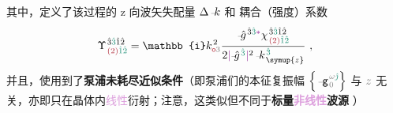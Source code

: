 其中，定义了该过程的 z 向\textcolor{PineGreen}{波矢失配量} $\Delta \xint{\begin{smallmatrix} ~ \\ {}^{}_{\mathcolor{gray}{-}} \\ ~ \end{smallmatrix}}{15}{k}$   和 \textcolor{NavyBlue}{耦合（强度）系数}
\begin{align} \label{eq:coupling-coeff}
	\Upsilon^{\;\! \hat{3} \textcolor{PineGreen}{\hat{3}} \hat{1} \hat{2} }_{\;\! \textcolor{Maroon}{(2)} \textcolor{PineGreen}{\hat{1} \hat{2}}} = \mathbb{i} k_{\textcolor{Maroon}{\mathsf{o}} \mathcolor{gray}{3}}^{\;\! 2} \frac{\xint{{}^{}_{\mathcolor{gray}{-}}}{10}{\hat{g}}^{\;\! \hat{3} \textcolor{PineGreen}{\hat{3}} \textcolor{Plum}{*}}_{\;\! } {\chi}^{\;\! \hat{3} \textcolor{PineGreen}{\hat{3}} \hat{1} \hat{2} }_{\;\! \textcolor{Maroon}{(2)} \textcolor{PineGreen}{\hat{1} \hat{2}}} }{ 2 \textcolor{Plum}{\lvert} \xint{{}^{}_{\mathcolor{gray}{-}}}{10}{\hat{g}}^{\;\! \textcolor{PineGreen}{\hat{3}}} \textcolor{Plum}{\rvert}^2 \xint{\begin{smallmatrix} ~ \\ {}^{}_{\mathcolor{gray}{-}} \\ ~ \end{smallmatrix}}{15}{k}_{\;\! \symup{z}}^{\;\!  \textcolor{PineGreen}{\hat{3}}} } ~,
\end{align}
并且，使用到了\textbf{\textcolor{NavyBlue}{泵浦未耗尽}近似条件}（即\textcolor{NavyBlue}{泵浦们}的\textcolor{PineGreen}{本征复振幅} $\left\{ \xint{\begin{smallmatrix} ~ \\ {}^{}_{\mathcolor{gray}{-}} \\ ~ \end{smallmatrix}}{09}{\mathtt{g}}^{\;\! \mathcolor{gray}{\omega} \textcolor{PineGreen}{\hat{\jmath}}}_{\;\! \mathcolor{gray}{0}} \right\}$ 与 $\mathcolor{gray}{z}$ 无关，亦即只在晶体内\textcolor{Plum}{线性}衍射；注意，这类似但不同于\textbf{标量\textcolor{Plum}{非线性}\textcolor{NavyBlue}{波源}} ）
